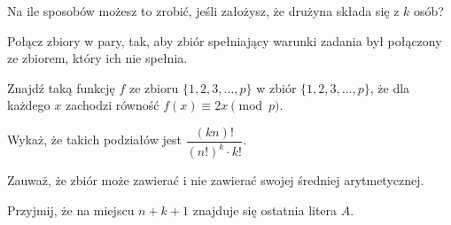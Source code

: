 
\begin{hints_list}
	\item Na ile sposobów możesz to zrobić, jeśli założysz, że drużyna składa się z $k$ osób?
	\item Połącz zbiory w pary, tak, aby zbiór spełniający warunki zadania był połączony ze zbiorem, który ich nie spełnia.
	\item *
	\item Znajdź taką funkcję $f$ ze zbioru $\{1, 2, 3,..., p\}$ w zbiór $\{1, 2, 3,..., p\}$, że dla każdego $x$ zachodzi równość $f(x) \equiv 2x \pmod{p}$.
	\item Wykaż, że takich podziałów jest $\dfrac{(kn)!}{(n!)^k \cdot k!}$.
	\item Zauważ, że zbiór może zawierać i nie zawierać swojej średniej arytmetycznej.
	\item Przyjmij, że na miejscu $n + k + 1$ znajduje się ostatnia litera $A$.
\end{hints_list}
